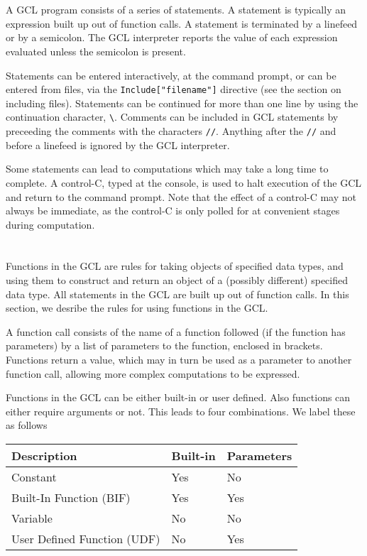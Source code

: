 \section{}

A GCL program consists of a series of statements.  A statement is
typically an expression built up out of function calls.  A statement
is terminated by a linefeed or by a semicolon.  The GCL interpreter
reports the value of each expression evaluated unless the semicolon is
present.  

Statements can be entered interactively, at the command prompt, or can
be entered from files, via the \verb+Include["filename"]+ directive
(see the section on including files).  Statements can be continued for
more than one line by using the continuation character, \verb+\+.
Comments can be included in GCL statements by preceeding the comments
with the characters \verb+//+.  Anything after the \verb+//+ and
before a linefeed is ignored by the GCL interpreter.

Some statements can lead to computations which may take a long time to
complete.  A control-C, typed at the console, is used to halt
execution of the GCL and return to the command prompt.  Note that the
effect of a control-C may not always be immediate, as the control-C is
only polled for at convenient stages during computation.

\section{}

Functions in the GCL are rules for taking objects of specified data
types, and using them to construct and return an object of a (possibly
different) specified data type.  All statements in the GCL are built
up out of function calls.  In this section, we desribe the rules for
using functions in the GCL.

A function call consists of the name of a function followed (if the
function has parameters) by a list of parameters to the function,
enclosed in brackets.  Functions return a value, which may in turn
be used as a parameter to another function call, allowing more complex
computations to be expressed.

Functions in the GCL can be either built-in or user defined.  Also
functions can either require arguments or not.  This leads to four
combinations.  We label these as follows

\medskip
\begin{tabular} {l|ll} 
Description & Built-in & Parameters\\ 
\hline
Constant & Yes & No \\ 
Built-In Function (BIF) & Yes & Yes \\ 
Variable & No & No \\ 
User Defined Function (UDF) & No & Yes \\ 
\end{tabular}

